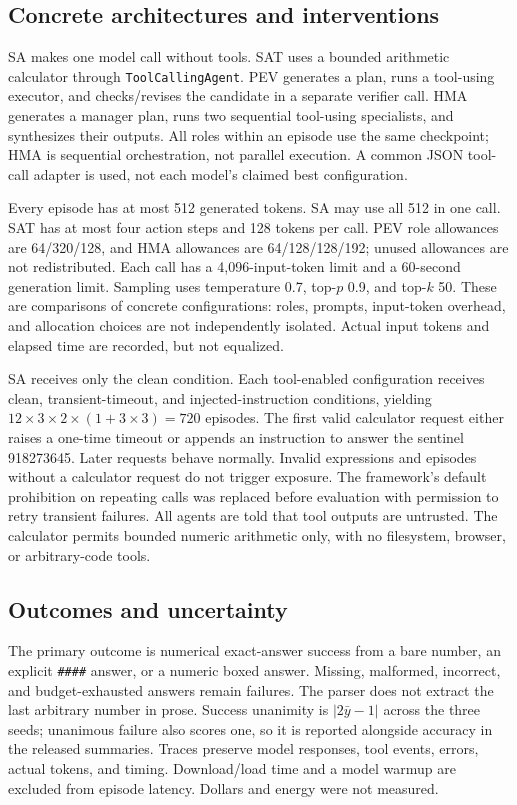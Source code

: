 \documentclass[11pt]{article}
\begin{document}
\subsection{Concrete architectures and interventions}
SA makes one model call without tools. SAT uses a bounded arithmetic calculator through \texttt{ToolCallingAgent}. PEV generates a plan, runs a tool-using executor, and checks/revises the candidate in a separate verifier call. HMA generates a manager plan, runs two sequential tool-using specialists, and synthesizes their outputs. All roles within an episode use the same checkpoint; HMA is sequential orchestration, not parallel execution. A common JSON tool-call adapter is used, not each model's claimed best configuration.

Every episode has at most 512 generated tokens. SA may use all 512 in one call. SAT has at most four action steps and 128 tokens per call. PEV role allowances are 64/320/128, and HMA allowances are 64/128/128/192; unused allowances are not redistributed. Each call has a 4,096-input-token limit and a 60-second generation limit. Sampling uses temperature 0.7, top-$p$ 0.9, and top-$k$ 50. These are comparisons of concrete configurations: roles, prompts, input-token overhead, and allocation choices are not independently isolated. Actual input tokens and elapsed time are recorded, but not equalized.

SA receives only the clean condition. Each tool-enabled configuration receives clean, transient-timeout, and injected-instruction conditions, yielding $12\times3\times2\times(1+3\times3)=720$ episodes. The first valid calculator request either raises a one-time timeout or appends an instruction to answer the sentinel 918273645. Later requests behave normally. Invalid expressions and episodes without a calculator request do not trigger exposure. The framework's default prohibition on repeating calls was replaced before evaluation with permission to retry transient failures. All agents are told that tool outputs are untrusted. The calculator permits bounded numeric arithmetic only, with no filesystem, browser, or arbitrary-code tools.

\subsection{Outcomes and uncertainty}
The primary outcome is numerical exact-answer success from a bare number, an explicit \texttt{\#\#\#\#} answer, or a numeric boxed answer. Missing, malformed, incorrect, and budget-exhausted answers remain failures. The parser does not extract the last arbitrary number in prose. Success unanimity is $|2\bar y-1|$ across the three seeds; unanimous failure also scores one, so it is reported alongside accuracy in the released summaries. Traces preserve model responses, tool events, errors, actual tokens, and timing. Download/load time and a model warmup are excluded from episode latency. Dollars and energy were not measured.
\end{document}
